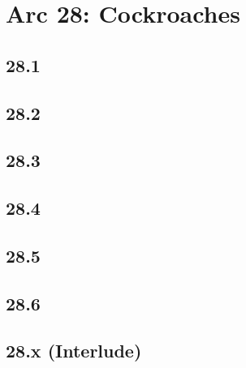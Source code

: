 \part*{Arc 28: Cockroaches}
 \chapter*{28.1}
 \chapter*{28.2}
 \chapter*{28.3}
 \chapter*{28.4}
 \chapter*{28.5}
 \chapter*{28.6}
 \chapter*{28.x (Interlude)}








